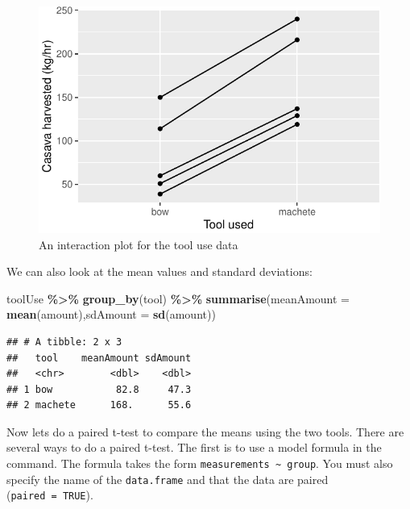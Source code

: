\documentclass[
  a4paperpaper,
]{book}
\newenvironment{Shaded}{\begin{snugshade}}{\end{snugshade}}
\newcommand{\DataTypeTok}[1]{\textcolor[rgb]{0.13,0.29,0.53}{#1}}
\newcommand{\KeywordTok}[1]{\textcolor[rgb]{0.13,0.29,0.53}{\textbf{#1}}}
\newcommand{\NormalTok}[1]{#1}
\newcommand{\OperatorTok}[1]{\textcolor[rgb]{0.81,0.36,0.00}{\textbf{#1}}}
\newcommand{\StringTok}[1]{\textcolor[rgb]{0.31,0.60,0.02}{#1}}
\begin{document}
\begin{figure}

{\centering \includegraphics{BB852_files/figure-latex/toolData-1} 

}

\caption{An interaction plot for the tool use data}\label{fig:toolData}
\end{figure}

We can also look at the mean values and standard deviations:

\begin{Shaded}
\begin{Highlighting}[]
\NormalTok{toolUse }\OperatorTok{\%\textgreater{}\%}
\StringTok{  }\KeywordTok{group\_by}\NormalTok{(tool) }\OperatorTok{\%\textgreater{}\%}
\StringTok{  }\KeywordTok{summarise}\NormalTok{(}\DataTypeTok{meanAmount =} \KeywordTok{mean}\NormalTok{(amount),}\DataTypeTok{sdAmount =} \KeywordTok{sd}\NormalTok{(amount))}
\end{Highlighting}
\end{Shaded}

\begin{verbatim}
## # A tibble: 2 x 3
##   tool    meanAmount sdAmount
##   <chr>        <dbl>    <dbl>
## 1 bow           82.8     47.3
## 2 machete      168.      55.6
\end{verbatim}

Now lets do a paired t-test to compare the means using the two tools. There are several ways to do a paired t-test. The first is to use a model formula in the command. The formula takes the form \texttt{measurements\ \textasciitilde{}\ group}. You must also specify the name of the \texttt{data.frame} and that the data are paired (\texttt{paired\ =\ TRUE}).
\end{document}
